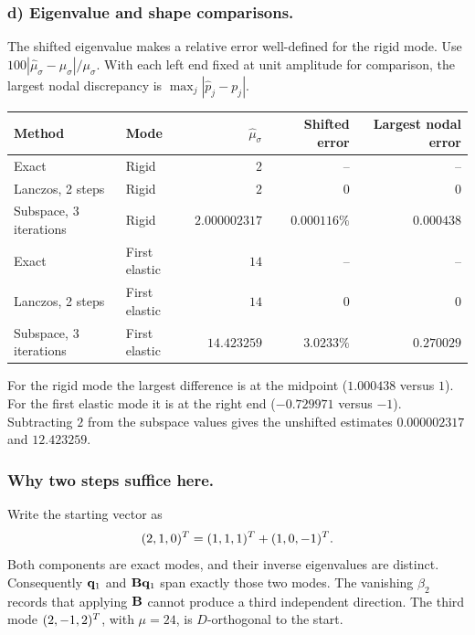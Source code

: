 \documentclass[12pt]{article}
\begin{document}
\subsubsection*{d) Eigenvalue and shape comparisons.}
The shifted eigenvalue makes a relative error well-defined for the rigid
mode. Use $100|\widehat\mu_\sigma-\mu_\sigma|/\mu_\sigma$. With each left
end fixed at unit amplitude for comparison, the largest nodal discrepancy
is $\max_j|\widehat p_j-p_j|$.
\begin{center}
  \begin{tabular}{@{}llrrr@{}}
    \toprule
    Method                 & Mode          & $\widehat\mu_\sigma$ & Shifted error & Largest nodal error \\
    \midrule
    Exact                  & Rigid         & $2$                  & --            & --                  \\
    Lanczos, 2 steps       & Rigid         & $2$                  & $0$           & $0$                 \\
    Subspace, 3 iterations & Rigid         & $2.000002317$        & $0.000116\%$  & $0.000438$          \\
    \addlinespace
    Exact                  & First elastic & $14$                 & --            & --                  \\
    Lanczos, 2 steps       & First elastic & $14$                 & $0$           & $0$                 \\
    Subspace, 3 iterations & First elastic & $14.423259$          & $3.0233\%$    & $0.270029$          \\
    \bottomrule
  \end{tabular}
\end{center}
For the rigid mode the largest difference is at the midpoint
($1.000438$ versus $1$). For the first elastic mode it is at the right
end ($-0.729971$ versus $-1$). Subtracting $2$ from the subspace values
gives the unshifted estimates $0.000002317$ and $12.423259$.

\subsubsection*{Why two steps suffice here.}
Write the starting vector as
\[
  (2,1,0)^{T}=(1,1,1)^{T}+(1,0,-1)^{T} .
\]
Both components are exact modes, and their inverse eigenvalues are distinct.
Consequently $\mathbf{q}_1$ and $\mathbf{B}\mathbf{q}_1$ span exactly those two modes.
The vanishing $\beta_2$ records that applying $\mathbf{B}$ cannot produce a
third independent direction. The third mode $(2,-1,2)^{T}$, with $\mu=24$,
is $D$-orthogonal to the start.
\end{document}
